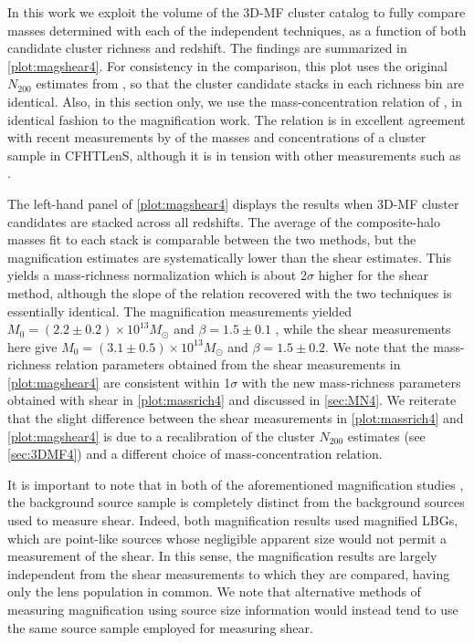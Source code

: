 In this work we exploit the volume of the \ac{3D-MF} cluster catalog to fully compare masses determined with each of the independent techniques, as a function of both candidate cluster richness and redshift. The findings are summarized in \autoref{plot:magshear4}. For consistency in the comparison, this plot uses the original $N_{200}$ estimates from \citet{Ford14}, so that the cluster candidate stacks in each richness bin are identical. Also, in this section only, we use the mass-concentration relation of \citet{Prada12}, in identical fashion to the magnification work. The \citet{Prada12} relation is in excellent agreement with recent measurements by \citet{Covone14} of the masses and concentrations of a cluster sample in \ac{CFHTLenS}, although it is in tension with other measurements such as \citet{Merten14}. 

The left-hand panel of \autoref{plot:magshear4} displays the results when \ac{3D-MF} cluster candidates are stacked across all redshifts. The average of the composite-halo masses fit to each stack is comparable between the two methods, but the magnification estimates are systematically lower than the shear estimates. This yields a mass-richness normalization which is about 2$\sigma$ higher for the shear method, although the slope of the relation recovered with the two techniques is essentially identical. The magnification measurements yielded $M_0 = (2.2 \pm 0.2) \times 10^{13} M_{\odot}$ and $\beta = 1.5 \pm 0.1$ \citep[see the miscentered model in][]{Ford14}, while the shear measurements here give $M_0 = (3.1 \pm 0.5) \times 10^{13} M_{\odot}$ and $\beta = 1.5 \pm 0.2$. We note that the mass-richness relation parameters obtained from the shear measurements in \autoref{plot:magshear4} are consistent within 1$\sigma$ with the new mass-richness parameters obtained with shear in \autoref{plot:massrich4} and discussed in \autoref{sec:MN4}. We reiterate that the slight difference between the shear measurements in \autoref{plot:massrich4} and \autoref{plot:magshear4} is due to a recalibration of the cluster $N_{200}$ estimates (see \autoref{sec:3DMF4}) and a different choice of mass-concentration relation.

It is important to note that in both of the aforementioned magnification studies \citep{Ford12,Ford14}, the background source sample is completely distinct from the background sources used to measure shear. Indeed, both magnification results used magnified \ac{LBG}s, which are point-like sources whose negligible apparent size would not permit a measurement of the shear. In this sense, the magnification results are largely independent from the shear measurements to which they are compared, having only the lens population in common. We note that alternative methods of measuring magnification using source size information would instead tend to use the same source sample employed for measuring shear.

